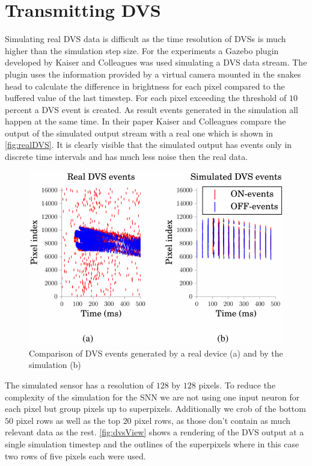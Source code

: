 \section{Transmitting DVS}
Simulating real DVS data is difficult as the time resolution of DVSs is much higher than the simulation step size. For the experiments a Gazebo plugin developed by Kaiser and Colleagues was used simulating a DVS data stream\cite{kaiser2016towards}. The plugin uses the information provided by a virtual camera mounted in the snakes head to calculate the difference in brightness for each pixel compared to the buffered value of the last timestep. For each pixel exceeding the threshold of $10$ percent a DVS event is created. 
As result events generated in the simulation all happen at the same time.
In their paper \cite{kaiser2016towards} Kaiser and Colleagues compare the output of the simulated output stream with a real one which is shown in \autoref{fig:realDVS}. It is clearly visible that the simulated output has events only in discrete time intervals and has much less noise then the real data.

\begin{figure}[htpb]
  \centering
  \includegraphics[width=\textwidth]{figures/realDvs.png}
  \caption{Comparison of DVS events generated by a real device (a) and by the simulation (b) \cite{kaiser2016towards}}
  \label{fig:realDVS}
\end{figure}
The simulated sensor has a resolution of $128$ by $128$ pixels. To reduce the complexity of the simulation for the SNN we are not using one input neuron for each pixel but group pixels up to superpixels. Additionally we crob of the bottom $50$ pixel rows as well as the top $20$ pixel rows, as those don't contain as much relevant data as the rest. \autoref{fig:dvsView} shows a rendering of the DVS output at a single simulation timestep and the outlines of the superpixels where in this case two rows of five pixels each were used.

